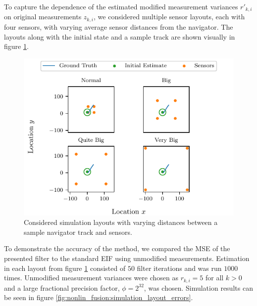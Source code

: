 To capture the dependence of the estimated modified measurement variances $r'_{k, i}$ on original measurements $z_{k, i}$, we considered multiple sensor layouts, each with four sensors, with varying average sensor distances from the navigator. The layouts along with the initial state and a sample track are shown visually in figure \ref{fig:nonlin_fusion:simulation_layouts}.
\begin{figure}[htbp]
    \centering
    \includegraphics{figures/nonlin_fusion_simulation_layouts.pdf}
    \caption{Considered simulation layouts with varying distances between a sample navigator track and sensors.}
    \label{fig:nonlin_fusion:simulation_layouts}
\end{figure}
To demonstrate the accuracy of the method, we compared the MSE of the presented filter to the standard EIF using unmodified measurements. Estimation in each layout from figure \ref{fig:nonlin_fusion:simulation_layouts} consisted of $50$ filter iterations and was run $1000$ times. Unmodified measurement variances were chosen as $r_{k, i}=5$ for all $k>0$ and a large fractional precision factor, $\phi=2^{32}$, was chosen. Simulation results can be seen in figure \ref{fig:nonlin_fusion:simulation_layout_errors}.
